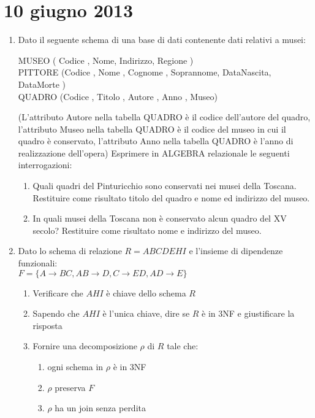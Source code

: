 \section{10 giugno 2013}

\begin{enumerate}
    \item Dato il seguente schema di una base di dati contenente dati relativi a musei:

    MUSEO ( Codice , Nome, Indirizzo, Regione ) \\
    PITTORE (Codice , Nome , Cognome , Soprannome, DataNascita, DataMorte ) \\
    QUADRO (Codice , Titolo , Autore , Anno , Museo)

    (L'attributo Autore nella tabella QUADRO \`e il codice dell'autore del quadro, l'attributo Museo nella tabella QUADRO \`e il codice del museo in cui il quadro \`e conservato, l'attributo Anno nella tabella QUADRO \`e l'anno di realizzazione dell'opera) Esprimere in ALGEBRA relazionale le seguenti interrogazioni:
    \begin{enumerate}
        \item Quali quadri  del Pinturicchio sono conservati nei musei della Toscana. Restituire come risultato titolo del quadro e nome ed indirizzo del museo.
        \item In quali musei della Toscana non \`e conservato alcun  quadro del XV secolo? Restituire come risultato  nome e indirizzo del museo.
    \end{enumerate}
    \item Dato lo schema di relazione $R = ABCDEHI$ e l'insieme di dipendenze funzionali: \\
    $F = \{ A \to BC , AB \to D , C \to ED , AD \to E \}$
    \begin{enumerate}
        \item Verificare che $AHI$ \`e chiave dello schema $R$
        \item Sapendo che $AHI$ \`e l'unica chiave, dire se $R$ \`e in 3NF e giustificare la risposta
        \item Fornire una decomposizione $\rho$ di $R$ tale che:
        \begin{enumerate}
            \item ogni schema in $\rho$ \`e in 3NF
            \item $\rho$  preserva $F$
            \item $\rho$  ha un join senza perdita
        \end{enumerate}

\end{enumerate}
\end{enumerate}
